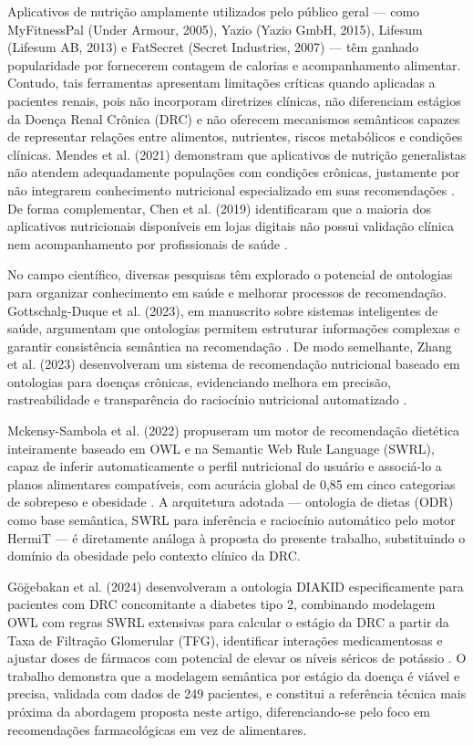 \documentclass[12pt, a4paper, twocolumn]{article}
\begin{document}
Aplicativos de nutrição amplamente utilizados pelo público geral --- como MyFitnessPal (Under Armour, 2005), Yazio (Yazio GmbH, 2015), Lifesum (Lifesum AB, 2013) e FatSecret (Secret Industries, 2007) --- têm ganhado popularidade por fornecerem contagem de calorias e acompanhamento alimentar. Contudo, tais ferramentas apresentam limitações críticas quando aplicadas a pacientes renais, pois não incorporam diretrizes clínicas, não diferenciam estágios da Doença Renal Crônica (DRC) e não oferecem mecanismos semânticos capazes de representar relações entre alimentos, nutrientes, riscos metabólicos e condições clínicas. Mendes et al. (2021) demonstram que aplicativos de nutrição generalistas não atendem adequadamente populações com condições crônicas, justamente por não integrarem conhecimento nutricional especializado em suas recomendações \cite{mendes2021}. De forma complementar, Chen et al. (2019) identificaram que a maioria dos aplicativos nutricionais disponíveis em lojas digitais não possui validação clínica nem acompanhamento por profissionais de saúde \cite{chen2019}.

No campo científico, diversas pesquisas têm explorado o potencial de ontologias para organizar conhecimento em saúde e melhorar processos de recomendação. Gottschalg-Duque et al. (2023), em manuscrito sobre sistemas inteligentes de saúde, argumentam que ontologias permitem estruturar informações complexas e garantir consistência semântica na recomendação \cite{paper_onto}. De modo semelhante, Zhang et al. (2023) desenvolveram um sistema de recomendação nutricional baseado em ontologias para doenças crônicas, evidenciando melhora em precisão, rastreabilidade e transparência do raciocínio nutricional automatizado \cite{zhang2023}.

Mckensy-Sambola et al. (2022) propuseram um motor de recomendação dietética inteiramente baseado em OWL e na Semantic Web Rule Language (SWRL), capaz de inferir automaticamente o perfil nutricional do usuário e associá-lo a planos alimentares compatíveis, com acurácia global de 0,85 em cinco categorias de sobrepeso e obesidade \cite{mckensy2022}. A arquitetura adotada --- ontologia de dietas (ODR) como base semântica, SWRL para inferência e raciocínio automático pelo motor HermiT --- é diretamente análoga à proposta do presente trabalho, substituindo o domínio da obesidade pelo contexto clínico da DRC.

Göğebakan et al. (2024) desenvolveram a ontologia DIAKID especificamente para pacientes com DRC concomitante a diabetes tipo 2, combinando modelagem OWL com regras SWRL extensivas para calcular o estágio da DRC a partir da Taxa de Filtração Glomerular (TFG), identificar interações medicamentosas e ajustar doses de fármacos com potencial de elevar os níveis séricos de potássio \cite{gogebakan2024}. O trabalho demonstra que a modelagem semântica por estágio da doença é viável e precisa, validada com dados de 249 pacientes, e constitui a referência técnica mais próxima da abordagem proposta neste artigo, diferenciando-se pelo foco em recomendações farmacológicas em vez de alimentares.
\end{document}
